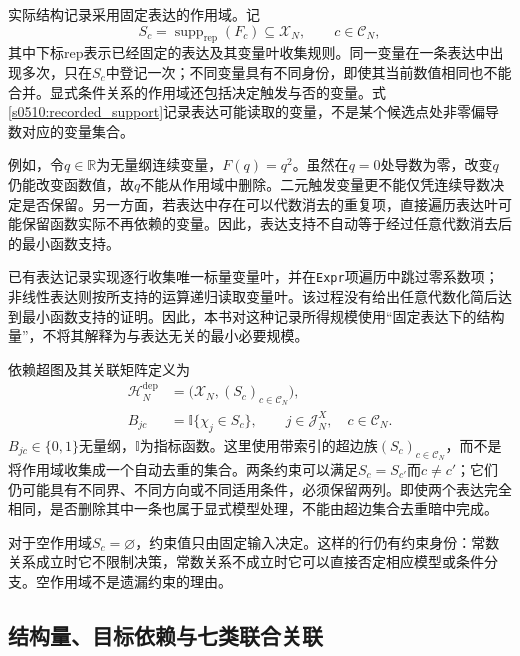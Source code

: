 实际结构记录采用固定表达的作用域。记
\begin{equation}
 S_c=\operatorname{supp}_{\mathrm{rep}}(F_c)
 \subseteq\mathcal X_N,
 \qquad c\in\mathcal C_N,
 \label{s0510:recorded_support}
\end{equation}
其中下标$\mathrm{rep}$表示已经固定的表达及其变量叶收集规则。同一变量在一条表达中出现多次，只在$S_c$中登记一次；不同变量具有不同身份，即使其当前数值相同也不能合并。显式条件关系的作用域还包括决定触发与否的变量。式\eqref{s0510:recorded_support}记录表达可能读取的变量，不是某个候选点处非零偏导数对应的变量集合。

例如，令$q\in\mathbb R$为无量纲连续变量，$F(q)=q^2$。虽然在$q=0$处导数为零，改变$q$仍能改变函数值，故$q$不能从作用域中删除。二元触发变量更不能仅凭连续导数决定是否保留。另一方面，若表达中存在可以代数消去的重复项，直接遍历表达叶可能保留函数实际不再依赖的变量。因此，表达支持不自动等于经过任意代数消去后的最小函数支持。

已有表达记录实现逐行收集唯一标量变量叶，并在\texttt{Expr}项遍历中跳过零系数项；非线性表达则按所支持的运算递归读取变量叶。该过程没有给出任意代数化简后达到最小函数支持的证明。因此，本书对这种记录所得规模使用“固定表达下的结构量”，不将其解释为与表达无关的最小必要规模。

依赖超图及其关联矩阵定义为
\begin{align}
 \mathcal H_N^{\mathrm{dep}}
 &=\bigl(\mathcal X_N,(S_c)_{c\in\mathcal C_N}\bigr),
 \label{s0510:indexed_hypergraph}\\
 B_{jc}
 &=\mathbb I\{\chi_j\in S_c\},
 \qquad j\in\mathcal J_N^X,\quad c\in\mathcal C_N.
 \label{s0510:incidence_matrix}
\end{align}
$B_{jc}\in\{0,1\}$无量纲，$\mathbb I$为指标函数。这里使用带索引的超边族$(S_c)_{c\in\mathcal C_N}$，而不是将作用域收集成一个自动去重的集合。两条约束可以满足$S_c=S_{c'}$而$c\ne c'$；它们仍可能具有不同界、不同方向或不同适用条件，必须保留两列。即使两个表达完全相同，是否删除其中一条也属于显式模型处理，不能由超边集合去重暗中完成。

对于空作用域$S_c=\varnothing$，约束值只由固定输入决定。这样的行仍有约束身份：常数关系成立时它不限制决策，常数关系不成立时它可以直接否定相应模型或条件分支。空作用域不是遗漏约束的理由。

\subsection{结构量、目标依赖与七类联合关联}

